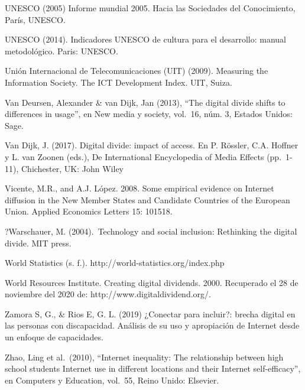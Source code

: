 UNESCO (2005) Informe mundial 2005. Hacia las Sociedades del
Conocimiento, París, UNESCO.

UNESCO (2014). Indicadores UNESCO de cultura para el desarrollo: manual
metodológico. Paris: UNESCO.

Unión Internacional de Telecomunicaciones (UIT) (2009). Measuring the
Information Society. The ICT Development Index. UIT, Suiza.

Van Deursen, Alexander \& van Dijk, Jan (2013), ``The digital divide
shifts to differences in usage'', en New media y society, vol.~16, núm.
3, Estados Unidos: Sage.

Van Dijk, J. (2017). Digital divide: impact of access. En P. Rössler,
C.A. Hoffner y L. van Zoonen (eds.), De International Encyclopedia of
Media Effects (pp.~1-11), Chichester, UK: John Wiley

Vicente, M.R., and A.J. López. 2008. Some empirical evidence on Internet
diffusion in the New Member States and Candidate Countries of the
European Union. Applied Economics Letters 15: 101518.

?Warschauer, M. (2004).~Technology and social inclusion: Rethinking the
digital divide. MIT press.

World Statistics (s. f.). http://world-statistics.org/index.php

World Resources Institute. Creating digital dividends. 2000. Recuperado
el 28 de noviembre del 2020 de: http://www.digitaldividend.org/.

Zamora S, G., \& Rios E, G. L. (2019) ¿Conectar para incluir?: brecha
digital en las personas con discapacidad. Análisis de su uso y
apropiación de Internet desde un enfoque de capacidades.

Zhao, Ling et al.~(2010), ``Internet inequality: The relationship
between high school students Internet use in different locations and
their Internet self-efficacy'', en Computers y Education, vol.~55, Reino
Unido: Elsevier.

